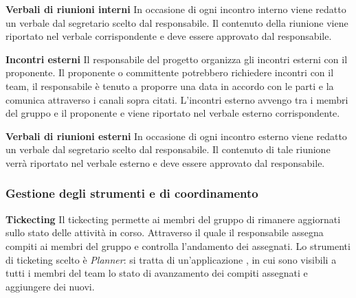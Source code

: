 \textbf{Verbali di riunioni interni} \newline \newline
In occasione di ogni incontro interno viene redatto un verbale dal segretario scelto dal responsabile. Il contenuto della riunione viene riportato nel verbale corrispondente e deve essere approvato dal responsabile.
\newline \newline

\textbf{Incontri esterni} \newline \newline
Il responsabile del progetto organizza gli incontri esterni con il proponente. Il proponente o committente potrebbero richiedere incontri con il team, il responsabile è tenuto a proporre una data in accordo con le parti e la comunica attraverso i canali sopra citati.
L'incontri esterno avvengo tra i membri del gruppo e il proponente e viene riportato nel verbale esterno corrispondente.
 \newline \newline

\textbf{Verbali di riunioni esterni} \newline \newline
In occasione di ogni incontro esterno viene redatto un verbale dal segretario scelto dal responsabile. Il contenuto di tale riunione verrà riportato nel verbale esterno e deve essere approvato dal responsabile.
\newline \newline
\subsubsection{Gestione degli strumenti e di coordinamento}

\textbf{Tickecting} \newline \newline
Il tickecting permette ai  membri del gruppo di rimanere aggiornati sullo stato delle attività in corso. Attraverso il quale il responsabile assegna compiti ai membri del gruppo e controlla l'andamento dei  assegnati. Lo strumenti di ticketing scelto è \textit{Planner}: si tratta di un'applicazione , in cui sono visibili a tutti i membri del team lo stato di avanzamento dei compiti assegnati e aggiungere dei nuovi. 
\newline \newline

